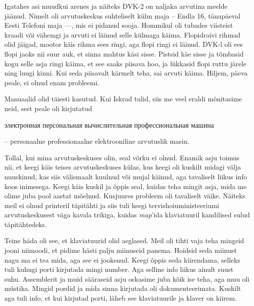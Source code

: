 Igatahes asi muudkui arenes ja näiteks DVK-2 on naljaka arvutina 
meelde jäänud. Nimelt oli arvutuskeskus suhteliselt külm maja -- Endla 16, 
tänapäeval Eesti Telefoni maja ---, mis ei pidanud sooja. Hommikul oli tubades viisteist kraadi või 
vähemgi ja arvuti ei läinud selle külmaga käima. Flopidraivi rihmad olid 
jäigad, mootor käis rihma sees ringi, aga flopi ringi ei läinud. 
DVK-l oli ees flopi jaoks nii suur auk, et sinna mahtus käsi sisse. 
Pistsid käe sisse ja tõmbasid kogu selle asja ringi käima, et see saaks piisava hoo, 
ja lükkasid flopi ruttu järele ning luugi kinni. Kui seda piisavalt kärmelt 
teha, sai arvuti käima. Hiljem, päeva peale, ei olnud enam probleemi. 


Manuaalid olid täiesti kasutud. Kui Iskrad 
tulid, siis me veel eraldi mõnitasime neid, sest peale oli kirjutatud 
\begin{russian}электронная персональная вычислительная профессиональная 
машина\end{russian} -- personaalne professionaalne elektrooniline arvutuslik 
masin. 


Tollal, kui mina arvutuskeskuses olin, seal võrku ei 
olnud. Enamik asju toimus nii, et keegi käis teises 
arvutuskeskuses külas, kus keegi oli kuskilt midagi välja nuuskinud, kas siis välismaalt kuulnud või mujal käinud, aga tavaliselt liikus info koos 
inimesega. Keegi käis kuskil ja õppis seal, kuidas teha 
mingit asja, mida me olime juba pool aastat mõelnud. Kusjuures probleem oli 
tavaliselt väike. Näiteks meil ei olnud printeril täpitähti ja siis tuli keegi tervishoiuministeeriumi arvutuskeskusest 
väga kavala trikiga, kuidas \emph{map}'ida klaviatuuril kandilised sulud 
täpitähtedeks.

Teine häda oli see, et klaviatuurid olid aeglased. Meil oli tihti vaja teha
mingeid jooni niimoodi, et pidime hästi palju miinuseid panema. Hoidsid seda miinust 
nagu ma ei tea mida, aga see ei jooksnud. Keegi õppis seda 
kiirendama, selleks tuli kuhugi porti kirjutada mingi number. Aga selline info 
liikus ainult suust suhu. Assemblerit ja muid sääraseid asju oskasime juba 
kõik ise teha, aga muu oli müstika. Mingid pordid ja mida sinna 
kirjutada oli dokumenteerimata. Kuskilt aga tuli info, et kui kirjutad porti, läheb see klaviatuurile ja klaver on kiirem. 

